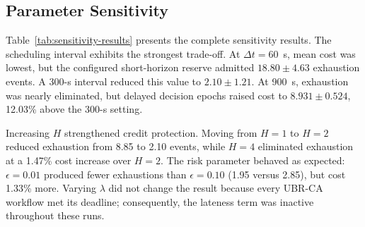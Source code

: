 \subsection{Parameter Sensitivity}
\label{subsec:sensitivity}

Table~\ref{tab:sensitivity-results} presents the complete sensitivity
results. The scheduling interval exhibits the strongest trade-off.
At $\Delta t=60$~s, mean cost was lowest, but the configured
short-horizon reserve admitted $18.80\pm4.63$ exhaustion events. A
300-s interval reduced this value to $2.10\pm1.21$. At 900~s,
exhaustion was nearly eliminated, but delayed decision epochs raised
cost to $8.931\pm0.524$, 12.03\% above the 300-s setting.

Increasing $H$ strengthened credit protection. Moving from $H=1$ to
$H=2$ reduced exhaustion from 8.85 to 2.10 events, while $H=4$
eliminated exhaustion at a 1.47\% cost increase over $H=2$. The risk
parameter behaved as expected: $\epsilon=0.01$ produced fewer
exhaustions than $\epsilon=0.10$ (1.95 versus 2.85), but cost 1.33\%
more. Varying $\lambda$ did not change the result because every
UBR-CA workflow met its deadline; consequently, the lateness term was
inactive throughout these runs.

\begin{table}[t]
\centering
\caption{UBR-CA parameter sensitivity
(mean $\pm$ standard deviation).}
\label{tab:sensitivity-results}
\scriptsize
{}
\end{table}

